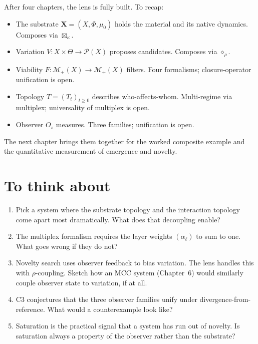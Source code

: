 After four chapters, the lens is fully built. To recap:

\begin{itemize}[leftmargin=1.5em,itemsep=2pt]
  \item The substrate $\mathbf{X} = (X, \Phi, \mu_0)$ holds the
    material and its native dynamics. Composes via $\boxtimes_\kappa$.
  \item Variation $V : X \times \Theta \to \mathcal{P}(X)$ proposes
    candidates. Composes via $\diamond_\rho$.
  \item Viability $F : \mathcal{M}_+(X) \to \mathcal{M}_+(X)$ filters.
    Four formalisms; closure-operator unification is open.
  \item Topology $T = (T_t)_{t \geq 0}$ describes who-affects-whom.
    Multi-regime via multiplex; universality of multiplex is open.
  \item Observer $O_s$ measures. Three families; unification is open.
\end{itemize}

The next chapter brings them together for the worked composite
example and the quantitative measurement of emergence and novelty.

\section*{To think about}

\begin{enumerate}
  \item Pick a system where the substrate topology and the
    interaction topology come apart most dramatically. What does that
    decoupling enable?
  \item The multiplex formalism requires the layer weights
    $(\alpha_\ell)$ to sum to one. What goes wrong if they do not?
  \item Novelty search uses observer feedback to bias variation. The
    lens handles this with $\rho$-coupling. Sketch how an MCC system
    (Chapter~6) would similarly couple observer state to variation,
    if at all.
  \item C3 conjectures that the three observer families unify under
    divergence-from-reference. What would a counterexample look like?
  \item Saturation is the practical signal that a system has run out
    of novelty. Is saturation always a property of the observer
    rather than the substrate?
\end{enumerate}
